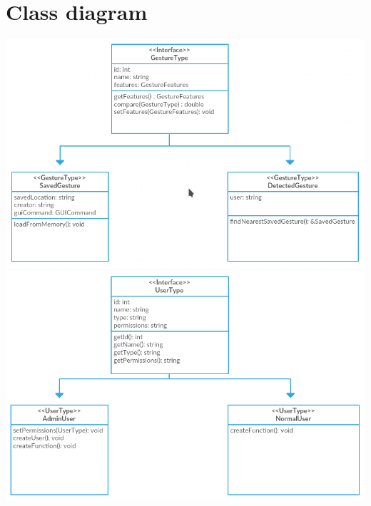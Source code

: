 \documentclass[11pt]{report}
\begin{document}
\section{Class diagram}
\begin{center}
    \includegraphics[width=14cm]{classdiagram.png}
    \vspace{10cm}
    \includegraphics[width=14cm]{UserClass.png}
\end{center}
\end{document}

